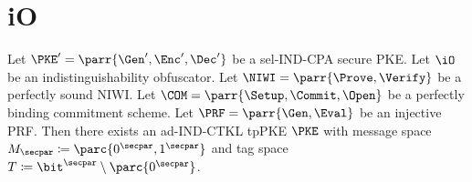 \section{iO}

\begin{theorem}[Informal]
    Let \(\PKE' = \parr{\Gen',\Enc',\Dec'}\) be a sel-IND-CPA secure PKE.
    Let \(\iO\) be an indistinguishability obfuscator.
    Let \(\NIWI = \parr{\Prove,\Verify}\) be a perfectly sound NIWI.
    Let \(\COM = \parr{\Setup,\Commit,\Open}\) be a perfectly binding commitment scheme.
    Let \(\PRF = \parr{\Gen,\Eval}\) be an injective PRF.
    Then there exists an ad-IND-CTKL tpPKE \(\PKE\) with message space \(M_\secpar \coloneq \parc{0^\secpar,1^\secpar}\) and tag space \(T \coloneqq \bit^\secpar \setminus \parc{0^\secpar}\).
\end{theorem}

